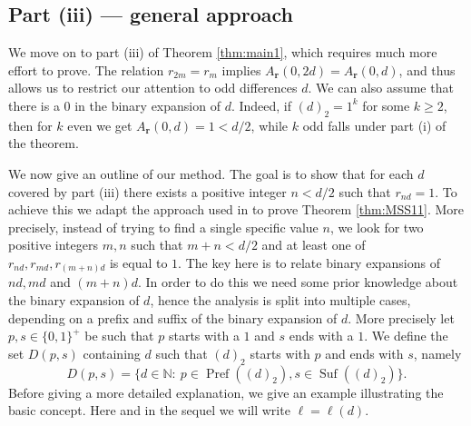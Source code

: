 \documentclass[a4paper,11pt]{amsart}
\theoremstyle{definition}
\newcommand{\N}{\mathbb{N}}
\newcommand{\Pref}{\operatorname{Pref}}
\newcommand{\Suf}{\operatorname{Suf}}
\begin{document}
\subsection{Part (iii) --- general approach} 

We move on to part (iii) of Theorem \ref{thm:main1}, which requires much more effort to prove. The relation $r_{2m} = r_{m}$ implies $A_{\mathbf{r}}(0,2d) = A_{\mathbf{r}}(0,d)$, and thus allows us to restrict our attention to odd differences $d$. We can also assume that there is a $0$ in the binary expansion of $d$. Indeed, if $(d)_2 = 1^k$ for some $k \geq 2$, then for $k$ even we get $A_{\mathbf{r}}(0,d)=1 < d/2$, while $k$ odd falls under part (i) of the theorem. 

We now give an outline of our method. The goal is to show that for each $d$ covered by part (iii) there exists a positive integer $n < d/2$ such that $r_{nd} = 1$. To achieve this we adapt the approach used in \cite{MSS11} to prove Theorem \ref{thm:MSS11}. More precisely, instead of trying to find a single specific value $n$, we look for two positive integers $m,n$ such that $m+n < d/2$ and at least one of $r_{nd}, r_{md}, r_{(m+n)d}$ is equal to $1$. The key here is to relate binary expansions of $nd, md$ and $(m+n)d$. In order to do this we need some prior knowledge about the binary expansion of $d$, hence the analysis is split into multiple cases, depending on a prefix and suffix of the binary expansion of $d$. More precisely let $p,s \in \{0,1\}^+$ be such that $p$ starts with a $1$ and $s$ ends with a $1$. We define the set $D(p,s)$ containing $d$ such that $(d)_2$ starts with $p$ and ends with $s$, namely
$$  D(p,s) = \{d \in \N: \ p \in \Pref((d)_2), s \in \Suf((d)_2)\}.  $$
Before giving a more detailed explanation, we give an example illustrating the basic concept. Here and in the sequel we will write $\ell = \ell(d)$.
\end{document}
